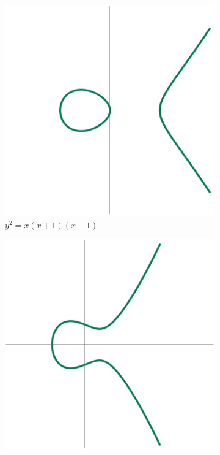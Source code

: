 \begin{frame}[plain]
	\begin{figure}[h]
	\centering
	\begin{subfigure}{0.30\textwidth}
	\includegraphics[width=\textwidth]{images/ec1.png}
	\caption*{$y^2 = x(x + 1)(x - 1)$}
	\end{subfigure} \qquad\qquad
	\begin{subfigure}{0.30\textwidth}
	\includegraphics[width=\textwidth]{images/ec2.png}

\end{subfigure}
\end{figure}
\end{frame}
